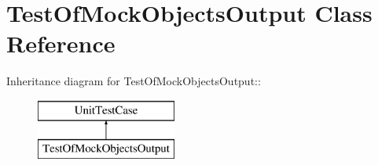 \hypertarget{class_test_of_mock_objects_output}{
\section{TestOfMockObjectsOutput Class Reference}
\label{class_test_of_mock_objects_output}
}
Inheritance diagram for TestOfMockObjectsOutput::\begin{figure}[H]
\begin{center}
\leavevmode
\includegraphics[height=2cm]{class_test_of_mock_objects_output}
\end{center}
\end{figure}
